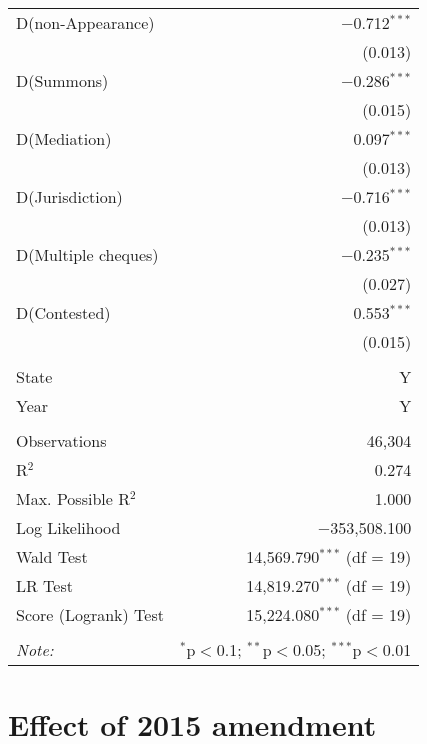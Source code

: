 \documentclass[12pt,a4paper]{article}
\begin{document}
\begin{appendices}
{\begin{longtable}[h]{lr}
			D(non-Appearance) & $-$0.712$^{***}$ \\ 
			& (0.013) \\ 
			D(Summons) & $-$0.286$^{***}$ \\ 
			& (0.015) \\ 
			D(Mediation) & 0.097$^{***}$ \\ 
			& (0.013) \\ 
			D(Jurisdiction) & $-$0.716$^{***}$ \\ 
			& (0.013) \\ 
			D(Multiple cheques) & $-$0.235$^{***}$ \\ 
			& (0.027) \\ 
			D(Contested) & 0.553$^{***}$ \\ 
			& (0.015) \\ 
			\hline \\[-1.8ex]
			State & Y \\
			Year & Y \\ 
			\hline \\[-1.8ex]
			Observations & 46,304 \\ 
			R$^{2}$ & 0.274 \\ 
			Max. Possible R$^{2}$ & 1.000 \\ 
			Log Likelihood & $-$353,508.100 \\ 
			Wald Test & 14,569.790$^{***}$ (df = 19) \\ 
			LR Test & 14,819.270$^{***}$ (df = 19) \\ 
			Score (Logrank) Test & 15,224.080$^{***}$ (df = 19) \\ 
			\hline 
			\hline \\[-1.8ex] 
			\textit{Note:} & \multicolumn{1}{r}{$^{*}$p$<$0.1; $^{**}$p$<$0.05; $^{***}$p$<$0.01} \\ 
	\end{longtable}}
	
	\newpage
	\section{Effect of 2015 amendment}
	\label{sec:ni2015effect}
	

\end{appendices}
\end{document}
